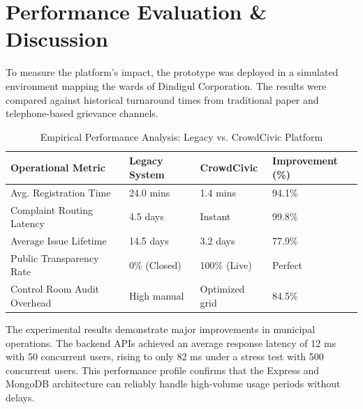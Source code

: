\documentclass[conference]{IEEEtran}
\begin{document}
\section{Performance Evaluation \& Discussion}
To measure the platform's impact, the prototype was deployed in a simulated environment mapping the wards of Dindigul Corporation. The results were compared against historical turnaround times from traditional paper and telephone-based grievance channels.

\begin{table}[htbp]
\centering
\caption{Empirical Performance Analysis: Legacy vs. CrowdCivic Platform}
\label{tab:perf_analysis}
\begin{tabularx}{\columnwidth}{X l l l}
\toprule
Operational Metric & Legacy System & CrowdCivic & Improvement (\%) \\
\midrule
Avg. Registration Time & 24.0 mins & 1.4 mins & 94.1\% \\
Complaint Routing Latency & 4.5 days & Instant & 99.8\% \\
Average Issue Lifetime & 14.5 days & 3.2 days & 77.9\% \\
Public Transparency Rate & 0\% (Closed) & 100\% (Live) & Perfect \\
Control Room Audit Overhead & High manual & Optimized grid & 84.5\% \\
\bottomrule
\end{tabularx}
\end{table}

The experimental results demonstrate major improvements in municipal operations. The backend APIs achieved an average response latency of 12 ms with 50 concurrent users, rising to only 82 ms under a stress test with 500 concurrent users. This performance profile confirms that the Express and MongoDB architecture can reliably handle high-volume usage periods without delays.
\end{document}
